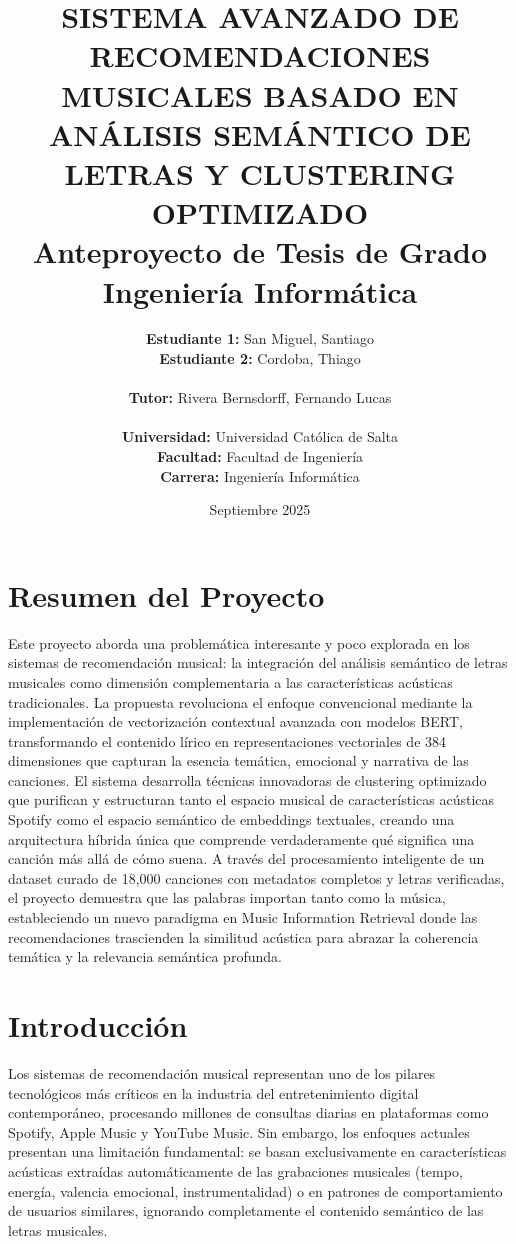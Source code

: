 \documentclass[12pt,a4paper]{article}
\title{\textbf{SISTEMA AVANZADO DE RECOMENDACIONES MUSICALES BASADO EN ANÁLISIS SEMÁNTICO DE LETRAS Y CLUSTERING OPTIMIZADO}\\
\vspace{0.5cm}
\large{Anteproyecto de Tesis de Grado}\\
\large{Ingeniería Informática}}
\author{
\textbf{Estudiante 1:} San Miguel, Santiago \\
\textbf{Estudiante 2:} Cordoba, Thiago \\
\\
\textbf{Tutor:} Rivera Bernsdorff, Fernando Lucas \\
\\
\textbf{Universidad:} Universidad Católica de Salta \\
\textbf{Facultad:} Facultad de Ingeniería \\
\textbf{Carrera:} Ingeniería Informática
}
\date{Septiembre 2025}
\begin{document}
\maketitle
\thispagestyle{empty}

\newpage


\section*{Resumen del Proyecto}

Este proyecto aborda una problemática interesante y poco explorada en los sistemas de recomendación musical: la integración del análisis semántico de letras musicales como dimensión complementaria a las características acústicas tradicionales. La propuesta revoluciona el enfoque convencional mediante la implementación de vectorización contextual avanzada con modelos BERT, transformando el contenido lírico en representaciones vectoriales de 384 dimensiones que capturan la esencia temática, emocional y narrativa de las canciones. El sistema desarrolla técnicas innovadoras de clustering optimizado que purifican y estructuran tanto el espacio musical de características acústicas Spotify como el espacio semántico de embeddings textuales, creando una arquitectura híbrida única que comprende verdaderamente qué significa una canción más allá de cómo suena. A través del procesamiento inteligente de un dataset curado de 18,000 canciones con metadatos completos y letras verificadas, el proyecto demuestra que las palabras importan tanto como la música, estableciendo un nuevo paradigma en Music Information Retrieval donde las recomendaciones trascienden la similitud acústica para abrazar la coherencia temática y la relevancia semántica profunda.

\newpage
\tableofcontents
\newpage

\section{Introducción}

Los sistemas de recomendación musical representan uno de los pilares tecnológicos más críticos en la industria del entretenimiento digital contemporáneo, procesando millones de consultas diarias en plataformas como Spotify, Apple Music y YouTube Music. Sin embargo, los enfoques actuales presentan una limitación fundamental: se basan exclusivamente en características acústicas extraídas automáticamente de las grabaciones musicales (tempo, energía, valencia emocional, instrumentalidad) o en patrones de comportamiento de usuarios similares, ignorando completamente el contenido semántico de las letras musicales.
\end{document}

